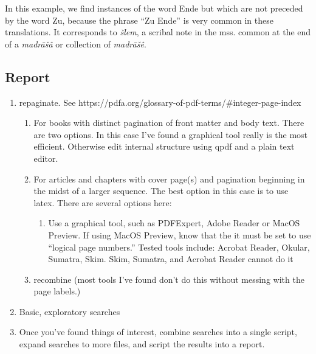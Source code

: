 \documentclass[
  letterpaper,
]{tufte-handout}
\providecommand{\tightlist}{%
  \setlength{\itemsep}{0pt}\setlength{\parskip}{0pt}}
\begin{document}
In this example, we find instances of the word Ende but which are not
preceded by the word Zu, because the phrase ``Zu Ende'' is very common
in these translations. It corresponds to \emph{šlem}, a scribal note in
the mss. common at the end of a \emph{madrāšâ} or collection of
\emph{madrāšê}.

\subsection{Report}\label{report}

\begin{enumerate}
\def\labelenumi{\arabic{enumi}.}
\setcounter{enumi}{2}
\tightlist
\item
  repaginate. See
  https://pdfa.org/glossary-of-pdf-terms/\#integer-page-index

  \begin{enumerate}
  \def\labelenumii{\arabic{enumii}.}
  \setcounter{enumii}{3}
  \tightlist
  \item
    For books with distinct pagination of front matter and body text.
    There are two options. In this case I've found a graphical tool
    really is the most efficient. Otherwise edit internal structure
    using qpdf and a plain text editor.
  \item
    For articles and chapters with cover page(s) and pagination
    beginning in the midst of a larger sequence. The best option in this
    case is to use latex. There are several options here:

    \begin{enumerate}
    \def\labelenumiii{\arabic{enumiii}.}
    \tightlist
    \item
      Use a graphical tool, such as PDFExpert, Adobe Reader or MacOS
      Preview. If using MacOS Preview, know that the it must be set to
      use ``logical page numbers.'' Tested tools include: Acrobat
      Reader, Okular, Sumatra, Skim. Skim, Sumatra, and Acrobat Reader
      cannot do it
    \end{enumerate}
  \item
    recombine (most tools I've found don't do this without messing with
    the page labels.)
  \end{enumerate}
\item
  Basic, exploratory searches
\item
  Once you've found things of interest, combine searches into a single
  script, expand searches to more files, and script the results into a
  report.
\end{enumerate}
\end{document}
